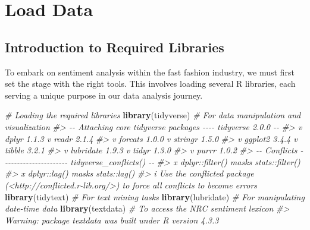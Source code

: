 \documentclass[
]{book}
\newenvironment{Shaded}{\begin{snugshade}}{\end{snugshade}}
\newcommand{\CommentTok}[1]{\textcolor[rgb]{0.56,0.35,0.01}{\textit{#1}}}
\newcommand{\FunctionTok}[1]{\textcolor[rgb]{0.13,0.29,0.53}{\textbf{#1}}}
\newcommand{\NormalTok}[1]{#1}
\begin{document}
\hypertarget{load-data}{%
\section{Load Data}\label{load-data}}

\hypertarget{introduction-to-required-libraries-1}{%
\subsection*{Introduction to Required Libraries}\label{introduction-to-required-libraries-1}}

To embark on sentiment analysis within the fast fashion industry, we must first set the stage with the right tools. This involves loading several R libraries, each serving a unique purpose in our data analysis journey.

\begin{Shaded}
\begin{Highlighting}[]
\CommentTok{\# Loading the required libraries}
\FunctionTok{library}\NormalTok{(tidyverse)  }\CommentTok{\# For data manipulation and visualization}
\CommentTok{\#\textgreater{} {-}{-} Attaching core tidyverse packages {-}{-}{-}{-} tidyverse 2.0.0 {-}{-}}
\CommentTok{\#\textgreater{} v dplyr     1.1.3     v readr     2.1.4}
\CommentTok{\#\textgreater{} v forcats   1.0.0     v stringr   1.5.0}
\CommentTok{\#\textgreater{} v ggplot2   3.4.4     v tibble    3.2.1}
\CommentTok{\#\textgreater{} v lubridate 1.9.3     v tidyr     1.3.0}
\CommentTok{\#\textgreater{} v purrr     1.0.2     }
\CommentTok{\#\textgreater{} {-}{-} Conflicts {-}{-}{-}{-}{-}{-}{-}{-}{-}{-}{-}{-}{-}{-}{-}{-}{-}{-}{-}{-}{-}{-} tidyverse\_conflicts() {-}{-}}
\CommentTok{\#\textgreater{} x dplyr::filter() masks stats::filter()}
\CommentTok{\#\textgreater{} x dplyr::lag()    masks stats::lag()}
\CommentTok{\#\textgreater{} i Use the conflicted package (\textless{}http://conflicted.r{-}lib.org/\textgreater{}) to force all conflicts to become errors}
\FunctionTok{library}\NormalTok{(tidytext)   }\CommentTok{\# For text mining tasks}
\FunctionTok{library}\NormalTok{(lubridate)  }\CommentTok{\# For manipulating date{-}time data}
\FunctionTok{library}\NormalTok{(textdata)   }\CommentTok{\# To access the NRC sentiment lexicon}
\CommentTok{\#\textgreater{} Warning: package \textquotesingle{}textdata\textquotesingle{} was built under R version 4.3.3}
\end{Highlighting}
\end{Shaded}
\end{document}
